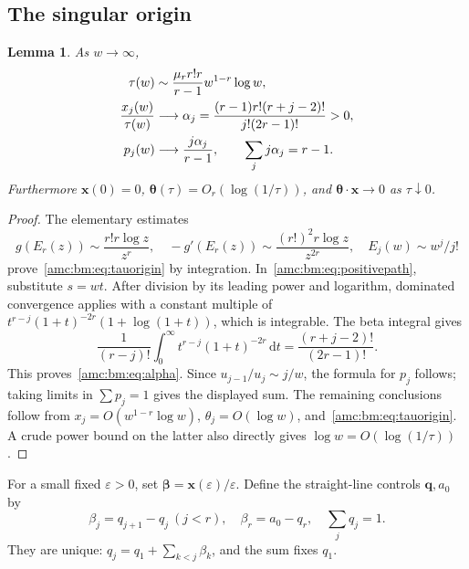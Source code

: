 \documentclass[11pt,letterpaper]{article}
\newtheorem{lemma}[theorem]{Lemma}
\theoremstyle{remark}\newtheorem{remark}[theorem]{Remark}
\newcommand{\dd}{\,\mathrm d}
\newcommand{\bx}{\boldsymbol x}
\newcommand{\btheta}{\boldsymbol\theta}
\begin{document}
\subsection{The singular origin}
\begin{lemma}\label{amc:bm:lem:origin}
As $w\to\infty$,
\begin{align}
 \tau(w)&\sim\frac{\mu_r r!r}{r-1}w^{1-r}\log w,\label{amc:bm:eq:tauorigin}\\
 \frac{x_j(w)}{\tau(w)}&\longrightarrow
 \alpha_j=\frac{(r-1)r!(r+j-2)!}{j!(2r-1)!}>0,\label{amc:bm:eq:alpha}\\
 p_j(w)&\longrightarrow\frac{j\alpha_j}{r-1},\qquad
 \sum_jj\alpha_j=r-1.\notag
\end{align}
Furthermore $\bx(0)=0$, $\btheta(\tau)=O_r(\log(1/\tau))$, and $\btheta\cdot\bx\to0$ as $\tau\downarrow0$.
\end{lemma}
\begin{proof}
The elementary estimates
\[
 g(E_r(z))\sim\frac{r!r\log z}{z^r},\quad
 -g'(E_r(z))\sim\frac{(r!)^2r\log z}{z^{2r}},\quad
 E_j(w)\sim w^j/j!
\]
prove~\eqref{amc:bm:eq:tauorigin} by integration. In~\eqref{amc:bm:eq:positivepath}, substitute $s=wt$. After division by its leading power and logarithm, dominated convergence applies with a constant multiple of
$t^{r-j}(1+t)^{-2r}(1+\log(1+t))$, which is integrable. The beta integral gives
\[
 \frac1{(r-j)!}\int_0^\infty t^{r-j}(1+t)^{-2r}\dd t
 =\frac{(r+j-2)!}{(2r-1)!}.
\]
This proves~\eqref{amc:bm:eq:alpha}. Since $u_{j-1}/u_j\sim j/w$, the formula for $p_j$ follows; taking limits in $\sum p_j=1$ gives the displayed sum. The remaining conclusions follow from $x_j=O(w^{1-r}\log w)$, $\theta_j=O(\log w)$, and~\eqref{amc:bm:eq:tauorigin}. A crude power bound on the latter also directly gives $\log w=O(\log(1/\tau))$.
\end{proof}

For a small fixed $\varepsilon>0$, set $\boldsymbol\beta=\bx(\varepsilon)/\varepsilon$. Define the straight-line controls $\boldsymbol q,a_0$ by
\begin{equation}\label{amc:bm:eq:linecontrols}
 \beta_j=q_{j+1}-q_j\ (j<r),\quad
 \beta_r=a_0-q_r,\quad \sum_jq_j=1.
\end{equation}
They are unique: $q_j=q_1+\sum_{k<j}\beta_k$, and the sum fixes $q_1$.
\end{document}
